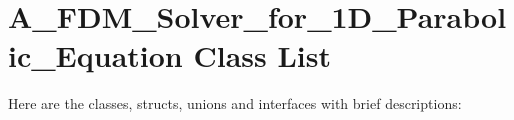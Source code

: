 \section{A\_\-FDM\_\-Solver\_\-for\_\-1D\_\-Parabolic\_\-Equation Class List}
Here are the classes, structs, unions and interfaces with brief descriptions:\begin{CompactList}
\item{}
\end{CompactList}
